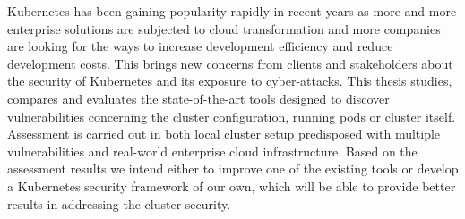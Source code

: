 Kubernetes has been gaining popularity rapidly in recent years as more and more enterprise solutions are subjected to cloud transformation and more companies are looking for the ways to increase development efficiency and reduce development costs. This brings new concerns from clients and stakeholders about the security of Kubernetes and its exposure to cyber-attacks.
This thesis studies, compares and evaluates the state-of-the-art tools designed to discover vulnerabilities concerning the cluster configuration, running pods or cluster itself. Assessment is carried out in both local cluster setup predisposed with multiple vulnerabilities and real-world enterprise cloud infrastructure. Based on the assessment results we intend either to improve one of the existing tools or develop a Kubernetes security framework of our own, which will be able to provide better results in addressing the cluster security.